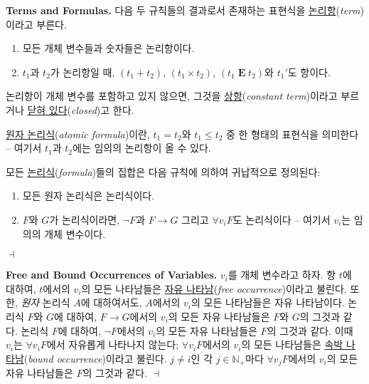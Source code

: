 \documentclass[12pt]{paper}
\newenvironment{context}[1][]{\noindent \textbf{{#1}.}}{\hfill $ \dashv $}
\begin{document}
  \begin{context}[Terms and Formulas]
    다음 두 규칙들의 결과로서 존재하는 표현식을 \underline{논리항}(\textit{term})이라고 부른다.
    \begin{enumerate}
      \item 모든 개체 변수들과 숫자들은 논리항이다.
      \item $t_{1}$과 $t_{2}$가 논리항일 때, $\left( t_{1} + t_{2} \right)$, $\left( t_{1} \times t_{2} \right)$, $\left( t_{1} \mathop{\mathbf{E}} t_{2} \right)$와 $t_{1} '$도 항이다.
    \end{enumerate}

    논리항이 개체 변수를 포함하고 있지 않으면, 그것을 \underline{상항}(\textit{constant term})이라고 부르거나 \underline{닫혀 있다}(\textit{closed})고 한다.

    \underline{원자 논리식}(\textit{atomic formula})이란,
    $t_{1} = t_{2}$와 $t_{1} \leq t_{2}$ 중 한 형태의 표현식을 의미한다 --
    여기서 $t_{1}$과 $t_{2}$에는 임의의 논리항이 올 수 있다.

    모든 \underline{논리식}(\textit{formula})들의 집합은 다음 규칙에 의하여 귀납적으로 정의된다:
    \begin{enumerate}
      \item 모든 원자 논리식은 논리식이다.
      \item $F$와 $G$가 논리식이라면, $\lnot F$과 $F \rightarrow G$ 그리고 $\forall v_{i} F$도 논리식이다 --
      여기서 $v_{i}$는 임의의 개체 변수이다.
    \end{enumerate}
  \end{context}

  \begin{context}[Free and Bound Occurrences of Variables]
    $v_{i}$를 개체 변수라고 하자.
    항 $t$에 대하여, $t$에서의 $v_{i}$의 모든 나타남들은 \underline{자유 나타남}(\textit{free occurrence})이라고 불린다.
    또한, \textit{원자} 논리식 $A$에 대하여서도, $A$에서의 $v_{i}$의 모든 나타남들은 자유 나타남이다.
    논리식 $F$와 $G$에 대하여, $F \rightarrow G$에서의 $v_{i}$의 모든 자유 나타남들은 $F$와 $G$의 그것과 같다.
    논리식 $F$에 대하여, $\lnot F$에서의 $v_{i}$의 모든 자유 나타남들은 $F$의 그것과 같다.
    이때 $v_{i}$는 $\forall v_{i} F$에서 자유롭게 나타나지 않는다;
    $\forall v_{i} F$에서의 $v_{i}$의 모든 나타남들은 \underline{속박 나타남}(\textit{bound occurrence})이라고 불린다.
    $j \neq i$인 각 $j \in \mathbb{N}_{+}$마다 $\forall v_{j} F$에서의 $v_{i}$의 모든 자유 나타남들은 $F$의 그것과 같다.
  \end{context}
\end{document}
